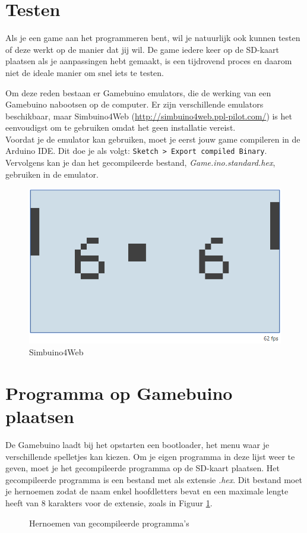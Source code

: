 \documentclass[a4paper,titlepage,12pt]{article}
\begin{document}
	\newpage
	\section{Testen}
	Als je een game aan het programmeren bent, wil je natuurlijk ook kunnen testen of deze werkt op de manier dat jij wil. De game iedere keer op de SD-kaart plaatsen als je aanpassingen hebt gemaakt, is een tijdrovend proces en daarom niet de ideale manier om snel iets te testen.
	
	Om deze reden bestaan er Gamebuino emulators\cite{Gamebuino:Wiki:Emulators}, die de werking van een Gamebuino nabootsen op de computer. Er zijn verschillende emulators beschikbaar, maar Simbuino4Web (\url{http://simbuino4web.ppl-pilot.com/}) is het eenvoudigst om te gebruiken omdat het geen installatie vereist. \\
	
	Voordat je de emulator kan gebruiken, moet je eerst jouw game compileren in de Arduino IDE. Dit doe je als volgt: \texttt{Sketch > Export compiled Binary}. Vervolgens kan je dan het gecompileerde bestand, \emph{Game.ino.standard.hex}, gebruiken in de emulator.
	
	\begin{figure}[!b]
		\includegraphics[width=\textwidth]{assets/img/Simbuino4Web.png}
		\caption{Simbuino4Web}
	\end{figure}
	
	
	\newpage
	\section{Programma op Gamebuino plaatsen}
	De Gamebuino laadt bij het opstarten een bootloader, het menu waar je verschillende spelletjes kan kiezen. Om je eigen programma in deze lijst weer te geven, moet je het gecompileerde programma op de SD-kaart plaatsen. Het gecompileerde programma is een bestand met als extensie \emph{.hex}. Dit bestand moet je hernoemen zodat de naam enkel hoofdletters bevat en een maximale lengte heeft van 8 karakters voor de extensie, zoals in Figuur \ref{fig:hernoemen}.
	\begin{figure}[h]
		\centering
		\caption{\label{fig:hernoemen}Hernoemen van gecompileerde programma's}
	\end{figure}
	
\end{document}
